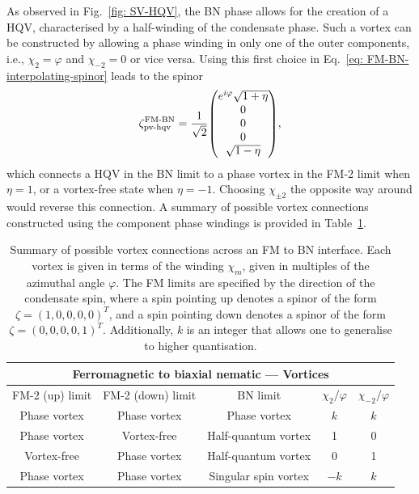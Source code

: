 As observed in Fig.~\ref{fig: SV-HQV}, the BN phase allows for the creation
of a HQV, characterised by a half-winding of the condensate phase.
Such a vortex can be constructed by allowing a phase winding in only one of the
outer components, i.e., \(\chi_2 = \varphi \) and \(\chi_{-2} = 0\) or vice
versa.
Using this first choice in Eq.~\eqref{eq: FM-BN-interpolating-spinor} leads to
the spinor
\begin{align}\label{eq: FM-BN-pv-hqv}
    \zeta^\text{FM-BN}_\text{pv-hqv} = \frac{1}{\sqrt{2}}\mqty(
    e^{i\varphi} \sqrt{1 + \eta} \\
    0 \\
    0 \\
    0 \\
    \sqrt{1 - \eta}),
\end{align}
which connects a HQV in the BN limit to a phase vortex in the FM-2 limit when
\(\eta = 1\), or a vortex-free state when \(\eta = -1\).
Choosing \(\chi_{\pm 2}\) the opposite way around would reverse this connection.
A summary of possible vortex connections constructed using the component phase
windings is provided in Table~\ref{tab: FM-BN-vortices}.
\begin{table}
    \centering
    \begin{tabular}{ccccc}
        \toprule
        \multicolumn{5}{c}{Ferromagnetic to biaxial nematic --- Vortices} \\
        \midrule
        FM-2 (up) limit & FM-2 (down) limit & BN limit &  \(\chi_2/\varphi \)
        & \(\chi_{-2}/\varphi \)  \\
        \midrule
         Phase vortex & Phase vortex & Phase vortex & \(k\) & \(k\) \\ 
         Phase vortex & Vortex-free & Half-quantum vortex & 1 & 0 \\
         Vortex-free & Phase vortex & Half-quantum vortex & 0 & 1 \\
         Phase vortex & Phase vortex & Singular spin vortex  & \(-k\) & \(k\) \\
        \bottomrule
    \end{tabular}
    \caption[Examples of possible vortex connections across a ferromagnetic
    to biaxial nematic interface]{\label{tab: FM-BN-vortices}
    Summary of possible vortex connections across an FM to BN interface.
    Each vortex is given in terms of the winding \(\chi_m\), given in multiples
    of the azimuthal angle \(\varphi \).
    The FM limits are specified by the direction of the condensate spin, where
    a spin pointing up denotes a spinor of the form
    \(\zeta={(1, 0, 0, 0, 0)}^T\), and a spin pointing down denotes a spinor of
    the form \(\zeta={(0, 0, 0, 0, 1)}^T\).
    Additionally, \(k\) is an integer that allows one to generalise to higher
    quantisation.}
\end{table}


